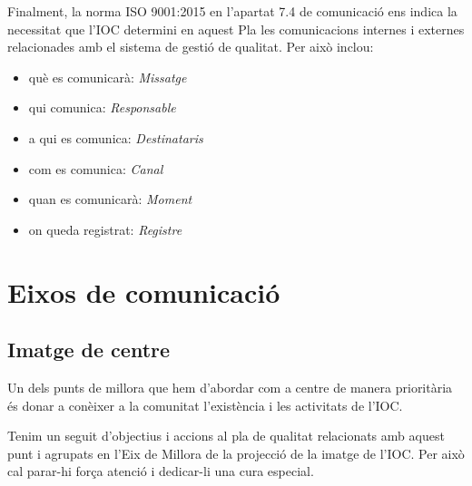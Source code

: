 \documentclass[fontsize=10pt,%
paper=a4,%
DIV=14,%
twoside=semi,%
pagesize=auto,%
parskip=half,
captions=tableheading,%
numbers=noenddot,%
toc=graduated%
]{scrartcl}
\begin{document}
Finalment, la norma ISO 9001:2015 en l'apartat 7.4 de comunicació ens indica la necessitat que l'IOC determini en aquest Pla les comunicacions internes i externes relacionades amb el sistema de gestió de qualitat. Per això inclou:

\begin{itemize}
\item  què es comunicarà: \textit{Missatge}
\item  qui comunica: \textit{Responsable}
\item  a qui es comunica: \textit{Destinataris}
\item  com es comunica: \textit{Canal}
\item  quan es comunicarà: \textit{Moment}
\item  on queda registrat: \textit{Registre}
\end{itemize}

\section{Eixos de comunicació}\label{sec:eixos}

\subsection{Imatge de centre}

Un dels punts de millora que hem d'abordar com a centre de manera prioritària és
donar a conèixer a la comunitat l'existència i les activitats de l'IOC.

Tenim un seguit d'objectius i accions al pla de qualitat relacionats amb aquest punt i agrupats en l'Eix de Millora de la projecció de la imatge de l'IOC. Per això cal parar-hi força atenció i dedicar-li una cura especial.
\end{document}

